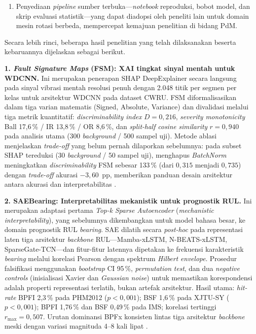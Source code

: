 \begin{enumerate}
  \item Penyediaan \emph{pipeline} sumber terbuka---\emph{notebook}
        reproduksi, bobot model, dan skrip evaluasi statistik---yang
        dapat diadopsi oleh peneliti lain untuk domain mesin rotasi
        berbeda, mempercepat kemajuan penelitian di bidang PdM.

\end{enumerate}

Secara lebih rinci, beberapa hasil penelitian yang telah dilaksanakan
beserta kebaruannya dijelaskan sebagai berikut.

\textbf{1. \emph{Fault Signature Maps} (FSM): XAI tingkat sinyal mentah
untuk WDCNN.}
Ini merupakan penerapan SHAP DeepExplainer secara langsung pada
sinyal vibrasi mentah resolusi penuh dengan 2.048 titik per segmen per kelas untuk
arsitektur WDCNN pada dataset CWRU.
FSM diformalisasikan dalam tiga varian matematis (Signed, Absolute, Variance)
dan divalidasi melalui tiga metrik kuantitatif: \emph{discriminability
index} $D = 0{,}216$, \emph{severity monotonicity} Ball 17{,}6\,\% /
IR 13{,}8\,\% / OR 8{,}6\,\%, dan \emph{split-half cosine similarity}
{\color{blue}$r = 0{,}940$ pada analisis utama (300 \emph{background} /
500 sampel uji)}.
Metode ablasi menjelaskan \emph{trade-off} yang belum pernah dilaporkan
sebelumnya: {\color{blue}pada subset SHAP tereduksi (30 \emph{background}
/ 50 sampel uji), menghapus \emph{BatchNorm} meningkatkan
\emph{discriminability} FSM sebesar 133\,\% (dari $0{,}315$ menjadi $0{,}735$)}
dengan \emph{trade-off} akurasi $-3{,}60$~pp,
memberikan panduan desain arsitektur antara akurasi dan interpretabilitas
.

\textbf{2. SAEBearing: Interpretabilitas mekanistik untuk prognostik RUL.}
Ini merupakan adaptasi pertama \emph{Top-k Sparse Autoencoder}
(\emph{mechanistic interpretability}), yang sebelumnya dikembangkan
untuk model bahasa besar, ke domain prognostik RUL \emph{bearing}.
SAE dilatih secara \emph{post-hoc} pada representasi laten tiga arsitektur
\emph{backbone} RUL---Mamba-xLSTM, N-BEATS-xLSTM, SparseGate-TCN---dan
fitur-fitur latennya dipetakan ke frekuensi karakteristik \emph{bearing}
melalui korelasi Pearson dengan spektrum \emph{Hilbert envelope}.
Prosedur falsifikasi menggunakan \emph{bootstrap} CI 95\,\%,
\emph{permutation test}, dan dua \emph{negative controls} (inisialisasi
Xavier dan \emph{Gaussian noise}) untuk memastikan korespondensi adalah
properti representasi terlatih, bukan artefak arsitektur.
Hasil utama: \emph{hit-rate} BPFI 2{,}3\,\% pada PHM2012
($p < 0{,}001$); BSF 1{,}6\,\% pada XJTU-SY ($p < 0{,}001$);
BPFI 1{,}76\,\% dan BSF 0{,}49\,\% pada IMS; korelasi tertinggi
$r_{\max} = 0{,}507$.
Urutan dominansi BPFx konsisten lintas tiga arsitektur \emph{backbone}
meski dengan variasi magnituda 4--8 kali lipat
.

